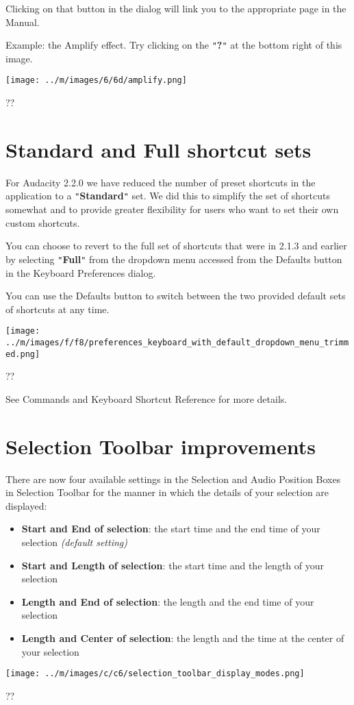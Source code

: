 \documentclass[twocolumn]{book}
\begin{document}
Clicking on that button in the dialog will link you to the appropriate page in the Manual.

Example: the Amplify effect.  Try clicking on the \texttt{{}"{}}\textbf{?}\texttt{{}"{}} at the bottom right of this image.\par\texttt{[image: ../m/images/6/6d/amplify.png]}\par??



\section{Standard and Full shortcut sets}


For Audacity 2.2.0 we have reduced the number of preset shortcuts in the application to a \texttt{{}"{}}\textbf{Standard}\texttt{{}"{}} set.  We did this to simplify the set of shortcuts somewhat and to provide greater flexibility for users who want to set their own custom shortcuts.

You can choose to revert to the full set of shortcuts that were in 2.1.3 and earlier by selecting \texttt{{}"{}}\textbf{Full}\texttt{{}"{}} from the dropdown menu accessed from the Defaults button in the Keyboard Preferences dialog.

You can use the Defaults button to switch between the two provided default sets of shortcuts at any time.\par\texttt{[image: ../m/images/f/f8/preferences\_keyboard\_with\_default\_dropdown\_menu\_trimmed.png]}\par??

See Commands and Keyboard Shortcut Reference for more details.



\section{Selection Toolbar improvements}


There are now four available settings in the Selection and Audio Position Boxes in Selection Toolbar for the  manner in which the details of your selection are displayed:
\begin{itemize}
\item \textbf{Start and End of selection}: the start time and the end time of your selection \textit{(default setting)}
\item \textbf{Start and Length of selection}: the start time and the length of your selection
\item \textbf{Length and End of selection}: the length and the end time of your selection
\item \textbf{Length and Center of selection}: the length and the time at the center of your selection
\end{itemize}
\par\texttt{[image: ../m/images/c/c6/selection\_toolbar\_display\_modes.png]}\par??
\end{document}

